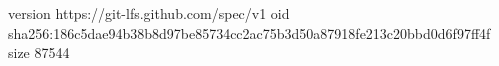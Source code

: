 version https://git-lfs.github.com/spec/v1
oid sha256:186c5dae94b38b8d97be85734cc2ac75b3d50a87918fe213c20bbd0d6f97ff4f
size 87544
